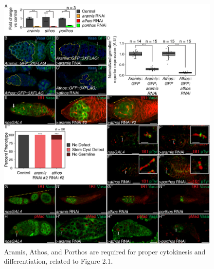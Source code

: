 \documentclass[12pt,oneside]{reedthesis}
\begin{document}
\begin{figure}

{\centering \includegraphics[width=6.5 in,height=8.9375 in]{./figure/Ribosome Biogenesis/Ribosome Biogenesis 1S} 

}

\caption[Aramis, Athos, and Porthos are required for proper cytokinesis and differentiation, related to Figure 2.1.]{Aramis, Athos, and Porthos are required for proper cytokinesis and differentiation, related to Figure 2.1.}\label{fig:unnamed-chunk-7}
\end{figure}
\textbf{\hfill\break
}
\end{document}
